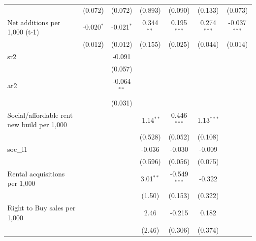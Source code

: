 \begin{table}[htbp]
\begin{tabular}{lcccccc}
                                                 & (0.072)       & (0.072)       & (0.893)      & (0.090)        & (0.133)       & (0.073)\\   
      Net additions per 1,000 (t-1)              & -0.020$^{*}$  & -0.021$^{*}$  & 0.344$^{**}$ & 0.195$^{***}$  & 0.274$^{***}$ & -0.037$^{***}$\\   
                                                 & (0.012)       & (0.012)       & (0.155)      & (0.025)        & (0.044)       & (0.014)\\   
      sr2                                        &               & -0.091        &              &                &               &   \\   
                                                 &               & (0.057)       &              &                &               &   \\   
      ar2                                        &               & -0.064$^{**}$ &              &                &               &   \\   
                                                 &               & (0.031)       &              &                &               &   \\   
      Social/affordable rent new build per 1,000 &               &               & -1.14$^{**}$ & 0.446$^{***}$  & 1.13$^{***}$  &   \\   
                                                 &               &               & (0.528)      & (0.052)        & (0.108)       &   \\   
      soc\_l1                                    &               &               & -0.036       & -0.030         & -0.009        &   \\   
                                                 &               &               & (0.596)      & (0.056)        & (0.075)       &   \\   
      Rental acquisitions per 1,000              &               &               & 3.01$^{**}$  & -0.549$^{***}$ & -0.322        &   \\   
                                                 &               &               & (1.50)       & (0.153)        & (0.322)       &   \\   
      Right to Buy sales per 1,000               &               &               & 2.46         & -0.215         & 0.182         &   \\   
                                                 &               &               & (2.46)       & (0.306)        & (0.374)       &   \\   

\end{tabular}
\end{table}
